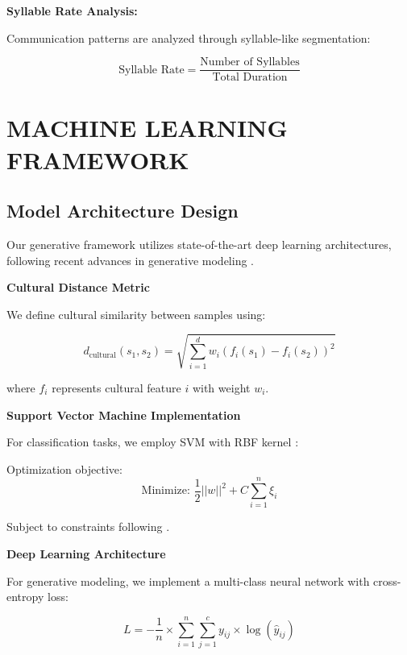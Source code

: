 \documentclass[12pt,a4paper]{article}
\begin{document}
\textbf{Syllable Rate Analysis:}

Communication patterns are analyzed through syllable-like segmentation:

\begin{equation}
\text{Syllable Rate} = \frac{\text{Number of Syllables}}{\text{Total Duration}}
\end{equation}

\section{MACHINE LEARNING FRAMEWORK}

\subsection{Model Architecture Design}

Our generative framework utilizes state-of-the-art deep learning architectures, following recent advances in generative modeling \citep{goodfellow2016deep, kingma2013auto}.

\textbf{Cultural Distance Metric}

We define cultural similarity between samples using:

\begin{equation}
d_{\text{cultural}}(s_1, s_2) = \sqrt{\sum_{i=1}^d w_i (f_i(s_1) - f_i(s_2))^2}
\end{equation}

where $f_i$ represents cultural feature $i$ with weight $w_i$.

\textbf{Support Vector Machine Implementation}

For classification tasks, we employ SVM with RBF kernel \citep{cortes1995support}:

Optimization objective:
\begin{equation}
\text{Minimize: } \frac{1}{2}||w||^2 + C \sum_{i=1}^n \xi_i
\end{equation}

Subject to constraints following \citet{scholkopf2000new}.

\textbf{Deep Learning Architecture}

For generative modeling, we implement a multi-class neural network with cross-entropy loss:

\begin{equation}
L = -\frac{1}{n} \times \sum_{i=1}^n \sum_{j=1}^c y_{ij} \times \log(\hat{y}_{ij})
\end{equation}
\end{document}
